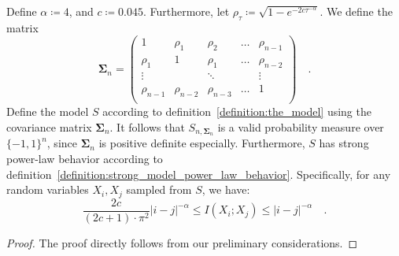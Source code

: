 \documentclass[../../main.tex]{subfiles}
\begin{document}
\begin{theorem}
    Define $\alpha \coloneqq 4$, and $c \coloneqq 0.045$. Furthermore, let $\rho_\tau \coloneqq \sqrt{1 - e^{-2c \tau^{-\alpha}}}$. We define the matrix
    \[
        \bm{\Sigma}_n = \begin{pmatrix*}
        1& \rho_1& \rho_2& \dots & \rho_{n-1} \\
        \rho_1& 1& \rho_1& \dots & \rho_{n-2} \\
        \vdots &  & \ddots & & \vdots \\
        \rho_{n-1} & \rho_{n-2} & \rho_{n-3} & \dots & 1 \\
    \end{pmatrix*} \quad .
    \]
    Define the model $S$ according to definition~\ref{definition:the_model} using the covariance matrix $\bm{\Sigma}_n$. It follows that $S_{n, \bm{\Sigma}_n}$ is a valid probability measure over $\{-1, 1\}^n$, since $\bm{\Sigma}_n$ is positive definite especially. Furthermore, $S$ has strong power-law behavior according to definition~\ref{definition:strong_model_power_law_behavior}. Specifically, for any random variables $X_i, X_j$ sampled from $S$, we have:
    \[
        \frac{2c}{(2c + 1) \cdot \pi^2} |i-j|^{-\alpha} \leq I(X_i; X_j) \leq |i-j|^{-\alpha} \quad .
    \]
\end{theorem}
\begin{proof}
    The proof directly follows from our preliminary considerations.
\end{proof}
\end{document}
